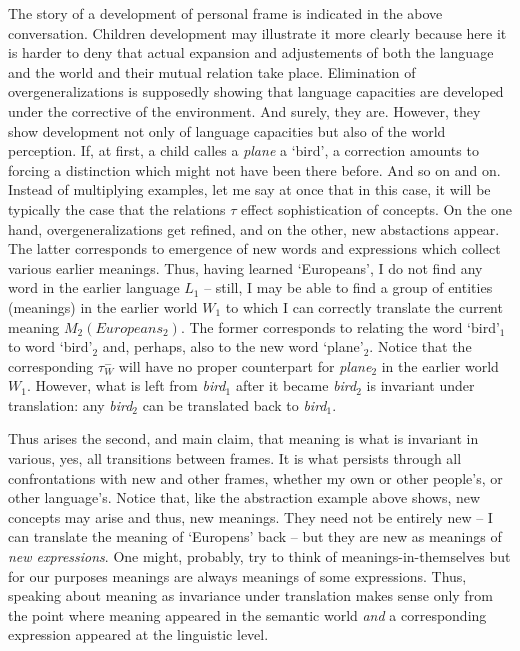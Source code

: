 \documentclass[10pt]{article}
\newcommand{\<}{\langle}
\renewcommand{\>}{\rangle}
\newcommand{\wo}[1]{`#1'}
\newcommand{\thi}[1]{{\sl{#1}\/}}
\begin{document}
The story of a development of personal frame is indicated in the above 
conversation. Children development may illustrate it more 
clearly because here it is harder to deny that actual expansion 
and adjustements of both the language and the world and their mutual 
relation take place. Elimination of overgeneralizations is supposedly 
showing that language capacities are developed under the corrective of the 
environment. And surely, they are. However, they show development not only 
of language capacities but also of the world perception.
 If, at first, a child calles a 
\thi{plane} a \wo{bird}, a correction amounts to forcing a distinction which 
might not have been there before. And so on and on. Instead of multiplying 
examples, let me say at once that in this case, it will be typically the 
case that the relations $\tau$ effect sophistication of concepts. On the 
one hand, overgeneralizations get refined, and on the other, new 
abstactions appear. The latter corresponds to emergence of new words and 
expressions which collect various earlier meanings. Thus, having learned 
\wo{Europeans}, I do not find any word in the earlier language $L_1$ -- 
still, I may be able to find a group of entities (meanings) in the earlier 
world $W_1$ to which I can correctly translate the current meaning 
$M_2(Europeans_2)$.
The former corresponds to relating the word 
\wo{bird}$_1$ to word \wo{bird}$_2$ and, perhaps, also to the new word 
\wo{plane}$_2$. Notice that the corresponding $\tau^-_W$ will have no 
proper counterpart for \thi{plane}$_2$ in the earlier world $W_1$.
However, what is left from \thi{bird}$_1$ after it became \thi{bird}$_2$ is 
invariant under translation: any \thi{bird}$_2$ can be translated back to 
\thi{bird}$_1$.

Thus arises the second, and main claim, that meaning is what is invariant 
in various, yes, all transitions between frames. It is what persists
through all confrontations with new and other frames, whether my own or 
other people's, or other language's. Notice that, like the abstraction 
example above shows, new concepts may arise and thus, new meanings. They 
need not be entirely new -- I can translate the meaning of \wo{Europens} 
back -- but they are new as meanings of {\em new expressions}. 
One might, probably, try to think of meanings-in-themselves but for our 
purposes meanings are always meanings of some expressions. Thus, 
speaking about meaning as invariance under translation makes sense only from the 
point where meaning appeared in the semantic world {\em and} a 
corresponding expression appeared at the linguistic level.
\end{document}
